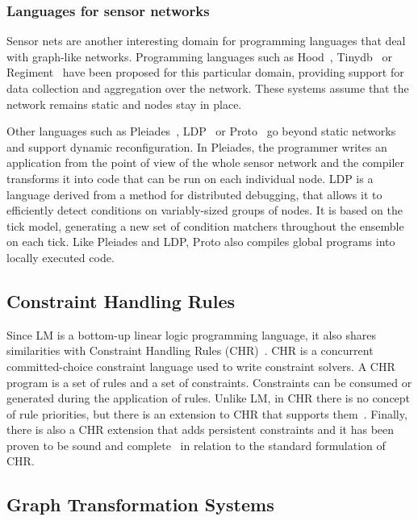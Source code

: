 \subsubsection{Languages for sensor networks}

Sensor nets are another interesting domain for programming languages that deal
with graph-like networks.  Programming languages such as
Hood~\cite{Whitehouse:2004:HNA:990064.990079},
Tinydb~\cite{Madden:2005:TAQ:1061318.1061322} or
Regiment~\cite{Newton:2007:RMS:1236360.1236422} have been proposed for this
particular domain, providing support for data collection and aggregation over
the network.  These systems assume that the network remains static and nodes
stay in place.

Other languages such as Pleiades~\cite{Kothari:2007:REP:1250734.1250757},
LDP~\cite{4543691} or Proto~\cite{Beal:2006:IEE:1137236.1137354} go beyond
static networks and support dynamic reconfiguration. In Pleiades, the
programmer writes an application from the point of view of the whole
sensor network and the compiler transforms it into code that can be run on
each individual node.  LDP is a language derived from a method for
distributed debugging, that allows it to efficiently detect conditions on
variably-sized groups of nodes. It is based on the tick model, generating
a new set of condition matchers throughout the ensemble on each tick.
Like Pleiades and LDP, Proto also compiles global programs into locally
executed code.

\subsection{Constraint Handling Rules}

Since LM is a bottom-up linear logic programming language, it also shares
similarities with Constraint Handling Rules
(CHR)~\cite{Betz:2005kx,Betz:2013:LBA:2422085.2422086}.  CHR is a concurrent
committed-choice constraint language used to write constraint solvers. A CHR
program is a set of rules and a set of constraints. Constraints can be consumed
or generated during the application of rules. Unlike LM, in CHR there is no
concept of rule priorities, but there is an extension to CHR that supports
them~\cite{DeKoninck:2007:URP:1273920.1273924}.  Finally, there is also a CHR
extension that adds persistent constraints and it has been proven to be sound
and complete~\cite{DBLP:journals/corr/abs-1007-3829} in relation to the standard
formulation of CHR.

\subsection{Graph Transformation Systems}

